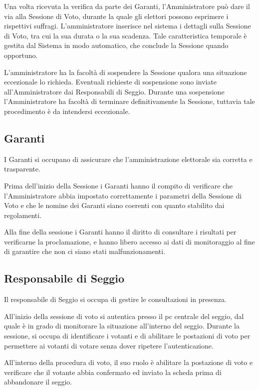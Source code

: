 \documentclass{report}
\begin{document}
Una volta ricevuta la verifica da parte dei Garanti, l'Amministratore può dare il via alla Sessione di Voto, durante la quale gli elettori possono esprimere i rispettivi suffragi. L'amministratore inserisce nel sistema i dettagli sulla Sessione di Voto, tra cui la sua durata o la sua scadenza. Tale caratteristica temporale è gestita dal Sistema in modo automatico, che conclude la Sessione quando opportuno.

L'amministratore ha la facoltà di sospendere la Sessione qualora una situazione eccezionale lo richieda. Eventuali richieste di sospensione sono inviate all'Amministratore dai Responsabili di Seggio. Durante una sospensione l'Amministratore ha facoltà di terminare definitivamente la Sessione, tuttavia tale procedimento è da intendersi eccezionale.


\subsection{Garanti}
I Garanti si occupano di assicurare che l'amministrazione elettorale sia corretta e trasparente.

Prima dell'inizio della Sessione i Garanti hanno il compito di verificare che l'Amministratore abbia impostato correttamente i parametri della Sessione di Voto e che le nomine dei Garanti siano coerenti con quanto stabilito dai regolamenti.

Alla fine della sessione i Garanti hanno il diritto di consultare i risultati per verificarne la proclamazione, e hanno libero accesso ai dati di monitoraggio al fine di garantire che non ci siano stati malfunzionamenti.

\subsection{Responsabile di Seggio}
Il responsabile di Seggio si occupa di gestire le consultazioni in presenza. 

All'inizio della sessione di voto si autentica presso il pc centrale del seggio, dal quale è in grado di monitorare la situazione all'interno del seggio. Durante la sessione, si occupa di identificare i votanti e di abilitare le postazioni di voto per permettere ai votanti di votare senza dover ripetere l'autenticazione.

All'interno della procedura di voto, il suo ruolo è abilitare la postazione di voto e verificare che il votante abbia confermato ed inviato la scheda prima di abbandonare il seggio.
\end{document}
